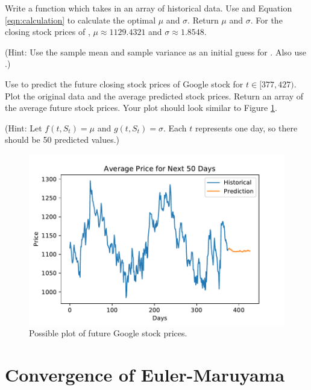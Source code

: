 \begin{problem}
Write a function  which takes in an array of historical data.
Use  and Equation \ref{eqn:calculation} to calculate the optimal $\mu$ and $\sigma$.
Return $\mu$ and $\sigma$.
For the closing stock prices of , $\mu\approx1129.4321$ and $\sigma\approx1.8548$.

(Hint: Use the sample mean and sample variance as an initial guess for . Also use .)
\label{prob:theta}
\end{problem}

\begin{problem}
Use  to predict the future closing stock prices of Google stock for $t\in[377,427)$.
Plot the original data and the average predicted stock prices.
Return an array of the average future stock prices.
Your plot should look similar to Figure \ref{fig:stock}.

(Hint: Let $f(t,S_t)=\mu$ and $g(t,S_t)=\sigma$. Each $t$ represents one day, so there should be 50 predicted values.)
\label{stock}
\end{problem}

\begin{figure}
\includegraphics[width=\textwidth]{figures/future_stock.pdf}
\caption{Possible plot of future Google stock prices.}
\label{fig:stock}
\end{figure}

\section*{Convergence of Euler-Maruyama}

